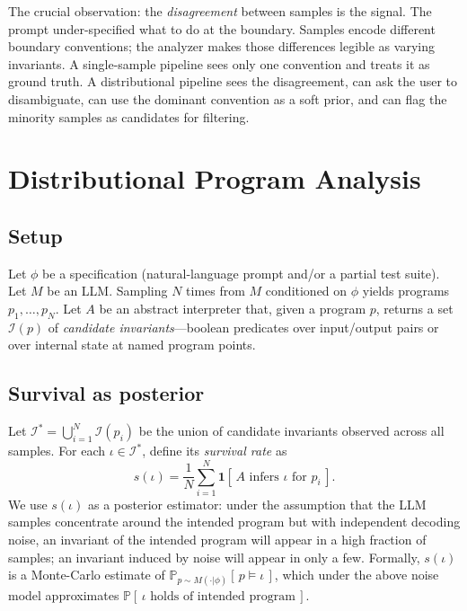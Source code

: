 \documentclass[sigconf,review,anonymous,nonacm]{acmart}
\newcommand{\Pr}{\mathbb{P}}
\renewcommand{\Pr}{\mathbb{P}} %
\newcommand{\samp}{\sim}
\begin{document}
The crucial observation: the \emph{disagreement} between samples is the
signal. The prompt under-specified what to do at the boundary. Samples
encode different boundary conventions; the analyzer makes those
differences legible as varying invariants. A single-sample pipeline sees
only one convention and treats it as ground truth. A distributional
pipeline sees the disagreement, can ask the user to disambiguate, can
use the dominant convention as a soft prior, and can flag the minority
samples as candidates for filtering.

\section{Distributional Program Analysis}
\label{sec:approach}

\subsection{Setup}
Let $\phi$ be a specification (natural-language prompt and/or a partial
test suite). Let $M$ be an LLM. Sampling $N$ times from $M$ conditioned
on $\phi$ yields programs $p_1,\dots,p_N$. Let $A$ be an abstract
interpreter that, given a program $p$, returns a set $\mathcal{I}(p)$ of
\emph{candidate invariants}---boolean predicates over input/output pairs
or over internal state at named program points.

\subsection{Survival as posterior}
Let $\mathcal{I}^* = \bigcup_{i=1}^N \mathcal{I}(p_i)$ be the union of
candidate invariants observed across all samples. For each $\iota \in
\mathcal{I}^*$, define its \emph{survival rate} as
\[
s(\iota) = \frac{1}{N}\sum_{i=1}^N \mathbf{1}[\,A \text{ infers } \iota \text{ for } p_i\,].
\]
We use $s(\iota)$ as a posterior estimator: under the assumption that
the LLM samples concentrate around the intended program but with
independent decoding noise, an invariant of the intended program will
appear in a high fraction of samples; an invariant induced by noise will
appear in only a few. Formally, $s(\iota)$ is a Monte-Carlo estimate of
$\Pr_{p \samp M(\cdot|\phi)}[\,p \models \iota\,]$, which under the
above noise model approximates $\Pr[\,\iota \text{ holds of intended
program}\,]$.
\end{document}
